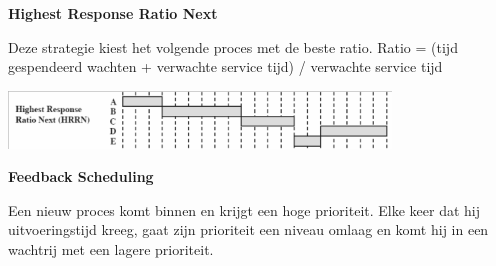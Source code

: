 \textbf{Highest Response Ratio Next}

Deze strategie kiest het volgende proces met de beste ratio.
Ratio = (tijd gespendeerd wachten + verwachte service tijd) / verwachte service tijd

\begin{center}
\includegraphics[width=4in]{img/hrrn.png}
\label{Highest Response Ratio Next voorbeeld}%
\end{center}

\textbf{Feedback Scheduling}

Een nieuw proces komt binnen en krijgt een hoge prioriteit. Elke keer dat hij uitvoeringstijd kreeg, gaat zijn prioriteit een niveau omlaag en komt hij in een wachtrij met een lagere prioriteit.

